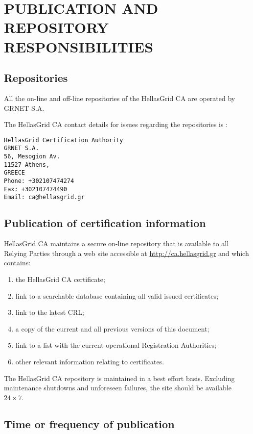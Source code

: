 
\chapter{PUBLICATION AND REPOSITORY RESPONSIBILITIES}
\section{Repositories}

All the on-line and off-line repositories of the HellasGrid CA are operated by GRNET S.A.

The HellasGrid CA contact details for issues regarding the repositories is :

\begin{verbatim}
HellasGrid Certification Authority
GRNET S.A.
56, Mesogion Av.
11527 Athens,
GREECE
Phone: +302107474274
Fax: +302107474490
Email: ca@hellasgrid.gr
\end{verbatim}

\section{Publication of certification information}
\label{sec:PublicationOfCertificationInformation}

HellasGrid CA maintains a secure on-line repository that is available to all Relying Parties through a web site accessible at \href{http://ca.hellasgrid.gr}{http://ca.hellasgrid.gr} and which contains:

\begin{enumerate}
\item{the HellasGrid CA certificate;}
\item{link to a searchable database containing all valid issued certificates;}
\item{link to the latest CRL;}
\item{a copy of the current and all previous versions of this document;}
\item{link to a list with the current operational Registration Authorities;}
\item{other relevant information relating to certificates.}
\end{enumerate}

The HellasGrid CA repository is maintained in a best effort basis. Excluding maintenance shutdowns and unforeseen failures, the site should be available $24\times 7$.

\section{Time or frequency of publication}

